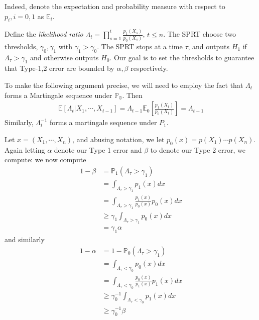 \documentclass[11pt]{article}
\renewcommand{\P}{\mathbb{P}}
\newcommand{\E}{\mathbb{E}}
\newcommand{\1}[1]{\mathbf{1}\left\{#1\right\}}
\begin{document}
Indeed, denote the expectation and probability measure with respect to $p_i, i=0,1$ as $\E_i$.

Define the \textit{likelihood ratio} $\Lambda_t = \prod_{s=1}^t \frac{p_1(X_s)}{p_0(X_s)}$, $t\leq n$. The SPRT choose two thresholds, $\gamma_0, \gamma_1$ with $\gamma_1 > \gamma_0$. The SPRT stops at a time $\tau$, and outputs $H_1$ if $\Lambda_{\tau} > \gamma_1$ and otherwise outputs $H_0$. Our goal is to set the thresholds to guarantee that Type-1,2 error are bounded by $\alpha, \beta$ respectively.  


To make the following argument precise, we will need to employ the fact that $\Lambda_t$ forms a Martingale sequence under $\mathbb{P_0}$.  Then 
\begin{align*}
    \E[\Lambda_t|X_1, \cdots, X_{t-1}] = \Lambda_{t-1} \E_0\left[\frac{p_1(X_{t})}{p_0(X_{t})}\right] = \Lambda_{t-1} 
\end{align*}
Similarly, $\Lambda_t^{-1}$ forms a martingale sequence under $P_1$.



\newcommand{\lambdatau}{\Lambda_{\tau}}
Let $x = (X_1, \cdots, X_n)$, and abusing notation, we let $p_0(x) = p(X_1)\cdots p(X_n)$. Again letting $\alpha$ denote our Type 1 error and $\beta$ to denote our Type 2 error, we compute:
we now compute 
\begin{align*}
    1-\beta 
    &= \P_1(\lambdatau > \gamma_1) \\
    &= \int_{\Lambda_{\tau} > \gamma_1} p_1(x) dx\\
    &= \int_{\Lambda_{\tau} > \gamma_1} \frac{p_1(x)}{p_0(x)} p_0(x)dx\tag{Wald's Ratio Identity}\\
    &\geq \gamma_1 \int_{\Lambda_{\tau} > \gamma_1} p_0(x) dx \\
    &= \gamma_1\alpha
\end{align*}
and similarly 
\begin{align*}
    1-\alpha
    &= 1-\P_0(\lambdatau > \gamma_1) \\
    &= \int_{\lambdatau < \gamma_0} p_0(x) dx\\
    &= \int_{\lambdatau < \gamma_0} \frac{p_0(x)}{p_1(x)} p_1(x)dx\tag{Wald's Ratio Identity}\\
    &\geq \gamma_0^{-1} \int_{\Lambda_{\tau} < \gamma_0} p_1(x) dx \\
    &\geq \gamma_0^{-1}\beta
\end{align*}
\end{document}
